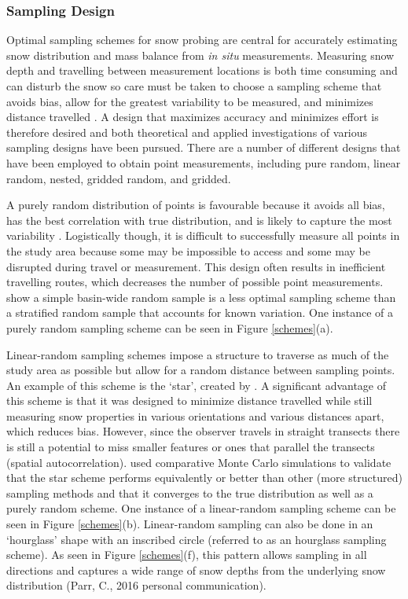 \documentclass{sfuthesis}
\begin{document}
\subsubsection{Sampling Design}

Optimal sampling schemes for snow probing are central for accurately estimating snow distribution and mass balance from \textit{in situ} measurements. Measuring snow depth and travelling between measurement locations is both time consuming and can disturb the snow so care must be taken to choose a sampling scheme that avoids bias, allow for the greatest variability to be measured, and minimizes distance travelled \citep{Shea2010}. A design that maximizes accuracy and minimizes effort is therefore desired \citep{Elder1991} and both theoretical \citep{Trujillo2015} and applied \citep{Kronholm2004,Shea2010} investigations of various sampling designs have been pursued. There are a number of different designs that have been employed to obtain point measurements, including pure random, linear random, nested, gridded random, and gridded. 

A purely random distribution of points is favourable because it avoids all bias, has the best correlation with true distribution, and is likely to capture the most variability \citep{Kronholm2007, Shea2010}. Logistically though, it is difficult to successfully measure all points in the study area because some may be impossible to access and some may be disrupted during travel or measurement. This design often results in inefficient travelling routes, which decreases the number of possible point measurements. \cite{Elder1991} show a simple basin-wide random sample is a less optimal sampling scheme than a stratified random sample that accounts for known variation. One instance of a purely random sampling scheme can be seen in Figure \ref{schemes}(a). 

Linear-random sampling schemes impose a structure to traverse as much of the study area as possible but allow for a random distance between sampling points. An example of this scheme is the `star', created by \cite{Shea2010}. A significant advantage of this scheme is that it was designed to minimize distance travelled while still measuring snow properties in various orientations and various distances apart, which reduces bias. However, since the observer travels in straight transects there is still a potential to miss smaller features or ones that parallel the transects (spatial autocorrelation). \cite{Shea2010} used comparative Monte Carlo simulations to validate that the star scheme performs equivalently or better than other (more structured) sampling methods and that it converges to the true distribution as well as a purely random scheme. One instance of a linear-random sampling scheme can be seen in Figure \ref{schemes}(b). Linear-random sampling can also be done in an `hourglass' shape with an inscribed circle (referred to as an hourglass sampling scheme). As seen in Figure \ref{schemes}(f), this pattern allows sampling in all directions and captures a wide range of snow depths from the underlying snow distribution (Parr, C., 2016 personal communication).
\end{document}
